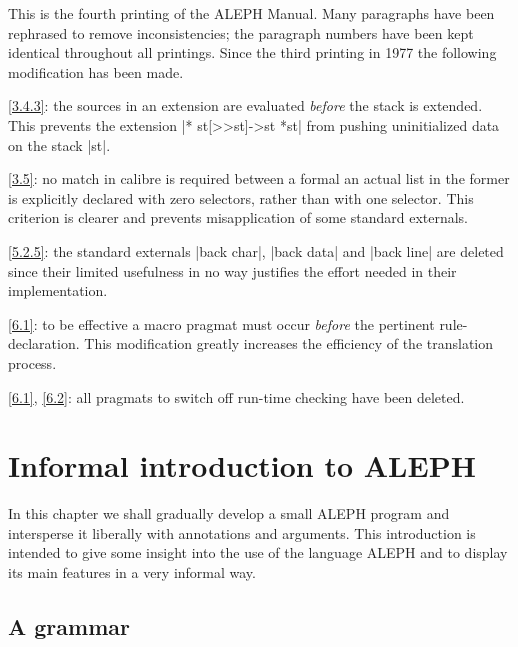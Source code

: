 \documentclass{article}
\newcommand\A{{\sf ALEPH}}
\newcommand\g[1]{{\sf #1}}
\begin{document}
\medskip

This is the fourth printing of the \A{} Manual. Many paragraphs have been
rephrased to remove inconsistencies; the paragraph numbers have been kept
identical throughout all printings. Since the third printing in 1977 the
following modification has been made.

\ref{3.4.3}: the \g{source}s in an \g{extension} are evaluated
\textit{before} the stack is extended. This prevents the \g{extension}
\pp|* st[>>st]->st *st| from pushing uninitialized data on the stack \pp|st|.

\ref{3.5}: no match in calibre is required between a formal an actual list in
the former is explicitly declared with zero selectors, rather than with one
selector. This criterion is clearer and prevents misapplication of some
standard externals.

\ref{5.2.5}: the standard externals \pp|back char|, \pp|back data| and
\pp|back line| are deleted since their limited usefulness in no way
justifies the effort needed in their implementation.

\ref{6.1}: to be effective a \g{macro} pragmat must occur \emph{before} the
pertinent \g{rule-declaration}. This modification greatly increases the
efficiency of the translation process.

\ref{6.1}, \ref{6.2}: all pragmats to switch off run-time checking have been
deleted.

%
%

\section{Informal introduction to \A}\label{1}

In this chapter we shall gradually develop a small \A{} program and
intersperse it liberally with annotations and arguments. This introduction
is intended to give some insight into the use of the language \A{} and to
display its main features in a very informal way.

\subsection{A grammar}\label{1.1}
\end{document}
